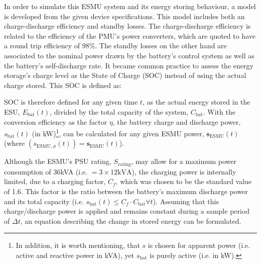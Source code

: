 In order to simulate this ESMU system and its energy storing behaviour, a model is developed from the given device specifications.
This model includes both an charge-discharge efficiency and standby losses.
The charge-discharge efficiency is related to the efficiency of the PMU's power converters, which are quoted to have a round trip efficiency of 98\%.
The standby losses on the other hand are associated to the nominal power drawn by the battery's control system as well as the battery's self-discharge rate.
It became common practice to assess the energy storage's charge level as the State of Charge (SOC) instead of using the actual charge stored.
This SOC is defined as:



\nomenclature[I]{$\eta$}{Round-trip efficiency of power electronics, where $\eta \in (0, 1]$ (Chapter \ref{ch1})}


SOC is therefore defined for any given time $t$, as the actual energy stored in the ESU, $E_\text{bat}(t)$, divided by the total capacity of the system, $C_\text{bat}$.
With the conversion efficiency as the factor $\eta$, the battery charge and discharge power, $s_\text{bat}(t)$ (in kW)\footnote[1]{In addition, it is worth mentioning, that $s$ is chosen for apparent power (i.e. active and reactive power in kVA), yet $s_\text{bat}$ is purely active (i.e. in kW).}, can be calculated for any given ESMU power, $\textbf{s}_\text{ESMU}(t)$ (where $(s_{\text{ESMU},\phi}(t)) = \textbf{s}_\text{ESMU}(t)$).




Although the ESMU's PSU rating, $S_\text{rating}$, may allow for a maximum power consumption of 36kVA (i.e. $=3\times12\text{kVA}$), the charging power is internally limited, due to a charging factor, $C_f$, which was chosen to be the standard value of 1.6.
This factor is the ratio between the battery's maximum discharge power and its total capacity (i.e. $s_\text{bat}(t) \leq C_f \cdot C_\text{bat} \forall t$).
Assuming that this charge/discharge power is applied and remains constant during a sample period of $\Delta t$, an equation describing the change in stored energy can be formulated.

